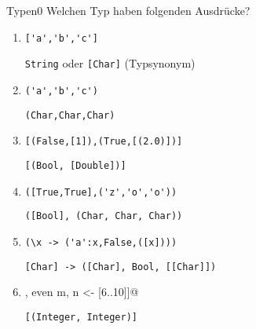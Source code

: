 \documentclass[11pt]{article}
\begin{document}


\begin{hausaufgabe}[keine]{Typen}{0}\label{Typen}%
Welchen Typ haben folgenden Ausdrücke?
\begin{enumerate}
  \item \verb|['a','b','c']|
    \begin{loesung}
      \verb|String| oder \verb|[Char]| (Typsynonym)
    \end{loesung}
  \item \verb|('a','b','c')|
    \begin{loesung}
      \verb|(Char,Char,Char)|
    \end{loesung}
  \item \verb|[(False,[1]),(True,[(2.0)])]|
    \begin{loesung}
      \verb|[(Bool, [Double])]|
    \end{loesung}
  \item \verb|([True,True],('z','o','o'))|
    \begin{loesung}
      \verb|([Bool], (Char, Char, Char))|
    \end{loesung}
  \item \verb|(\x -> ('a':x,False,([x])))|
    \begin{loesung}
      \verb|[Char] -> ([Char], Bool, [[Char]])|
    \end{loesung}
  \item \verb@[(\x y-> (x*2,y-1)) m n | m <- [1..5], even m, n <- [6..10]]@
      \begin{loesung}
        \verb|[(Integer, Integer)]|
      \end{loesung}

\end{enumerate}
\end{hausaufgabe}
\end{document}
